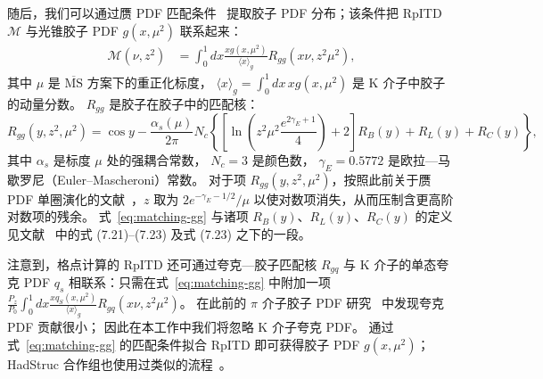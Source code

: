 随后，我们可以通过赝 PDF 匹配条件~\cite{Balitsky:2019krf} 提取胶子 PDF 分布；该条件把 RpITD $\mathscr{M}$ 与光锥胶子 PDF $g(x,\mu^2)$ 联系起来：
%
\begin{align}
\mathscr{M}(\nu,z^2)&=\int_0^1 dx \frac{xg(x,\mu^2)}{\langle x \rangle_g}R_{gg}(x\nu,z^2\mu^2),
\label{eq:matching-gg}
\end{align}
%
其中 $\mu$ 是 $\overline{\text{MS}}$ 方案下的重正化标度，
$\langle x \rangle_g=\int_0^1 dx \, x g(x,\mu^2)$ 是 K 介子中胶子的动量分数。
$R_{gg}$ 是胶子在胶子中的匹配核：
%
\begin{equation}
R_{gg}(y,z^2,\mu^2)
=\cos y -\frac{\alpha_s(\mu)}{2\pi}N_c
\left\{ \left[\ln\left(z^2\mu^2\frac{e^{2\gamma_E+1}}{4}\right)+2\right]R_B(y)+R_L(y)+R_C(y)\right\}, \nonumber
\label{eq:Rgg}
\end{equation}
%
其中 $\alpha_s$ 是标度 $\mu$ 处的强耦合常数，
$N_c=3$ 是颜色数，
$\gamma_E=0.5772$ 是欧拉—马歇罗尼（Euler--Mascheroni）常数。
对于项 $R_{gg}(y,z^2,\mu^2)$，按照此前关于赝 PDF 单圈演化的文献~\cite{Radyushkin:2018cvn}，$z$ 取为 $2e^{-\gamma_E-1/2}/\mu$ 以使对数项消失，从而压制含更高阶对数项的残余。
式~\ref{eq:matching-gg} 与诸项 $R_B(y)$、$R_L(y)$、$R_C(y)$ 的定义见文献~\cite{Balitsky:2019krf} 中的式 (7.21)--(7.23) 及式 (7.23) 之下的一段。

注意到，格点计算的 RpITD 还可通过夸克—胶子匹配核 $R_{gq}$ 与 K 介子的单态夸克 PDF $q_s$ 相联系：只需在式~\ref{eq:matching-gg} 中附加一项 $\frac{P_z}{P_0}\int_0^1 dx \frac{xq_S(x,\mu^2)}{\langle x \rangle_g}R_{gq}(x\nu,z^2\mu^2)$。
在此前的 $\pi$ 介子胶子 PDF 研究~\cite{Fan:2021bcr} 中发现夸克 PDF 贡献很小；
因此在本工作中我们将忽略 K 介子夸克 PDF。
通过式~\ref{eq:matching-gg} 的匹配条件拟合 RpITD 即可获得胶子 PDF $g(x,\mu^2)$；
HadStruc 合作组也使用过类似的流程~\cite{Joo:2019bzr,Joo:2020spy,HadStruc:2021wmh}。

